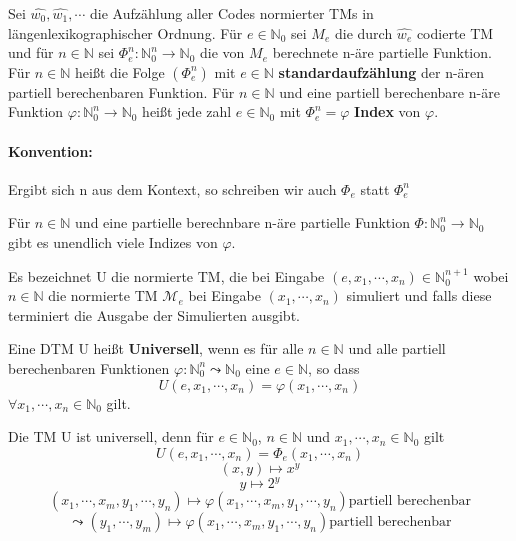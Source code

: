   Sei \(\hat{w_0}, \hat{w_1}, \cdots\) die Aufzählung aller Codes normierter TMs in längenlexikographischer Ordnung. Für \(e \in \mathbb{N}_0\) sei \(M_e\) die durch \(\hat{w_e}\) codierte TM und für \(n \in \mathbb{N}\) sei \(\Phi_e^n : \mathbb{N}_0^n \rightarrow \mathbb{N}_0\) die von \(M_e\) berechnete n-äre partielle Funktion. Für \(n \in \mathbb{N}\) heißt die Folge \((\Phi_e^n)\) mit \(e\in \mathbb{N}\) \textbf{standardaufzählung} der n-ären partiell berechenbaren Funktion. Für \(n \in \mathbb{N} \) und eine partiell berechenbare n-äre Funktion \(\varphi: \mathbb{N}_0^n \rightarrow \mathbb{N}_0\) heißt jede zahl \(e \in \mathbb{N}_0\) mit \(\Phi_e^n = \varphi\) \textbf{Index} von \(\varphi\).

  \paragraph{Konvention: } 
    Ergibt sich n aus dem Kontext, so schreiben wir auch \(\Phi_e\) statt \(\Phi_e^n\)

  Für \(n \in \mathbb{N}\) und eine partielle berechnbare n-äre partielle Funktion \(\Phi : \mathbb{N}_0^n \rightarrow \mathbb{N}_0\) gibt es unendlich viele Indizes von \(\varphi\).

  Es bezeichnet U die normierte TM, die bei Eingabe \((e, x_1, \cdots, x_n) \in \mathbb{N}_0^{n+1}\) wobei \(n \in \mathbb{N}\) die normierte TM \(\mathcal{M}_e\) bei Eingabe \((x_1, \cdots, x_n)\) simuliert und falls diese terminiert die Ausgabe der Simulierten ausgibt.

  Eine DTM U heißt \textbf{Universell}, wenn es für alle \(n \in \mathbb{N}\) und alle partiell berechenbaren Funktionen \(\varphi : \mathbb{N}_0^n \leadsto \mathbb{N}_0\) eine \(e \in \mathbb{N}\), so dass \[U(e, x_1, \cdots, x_n) = \varphi(x_1, \cdots, x_n)\] \(\forall x_1, \cdots, x_n \in \mathbb{N}_0\) gilt.

  Die TM U ist universell, denn für \(e \in \mathbb{N}_0\), \(n \in \mathbb{N}\) und \(x_1, \cdots, x_n \in \mathbb{N}_0\) gilt 
  \[
    U(e,x_1, \cdots, x_n) = \Phi_e(x_1, \cdots, x_n)
  \]
  \[
    (x, y) \mapsto x^y\] \[y \mapsto 2^y
  \] 
  \[
    (x_1, \cdots, x_m, y_1, \cdots, y_n) \mapsto \varphi(x_1, \cdots, x_m, y_1, \cdots, y_n) \text{partiell berechenbar}
  \]
  \[
    \leadsto (y_1,\cdots, y_m) \mapsto \varphi(x_1, \cdots, x_m, y_1, \cdots, y_n) \text{partiell berechenbar}
  \]

